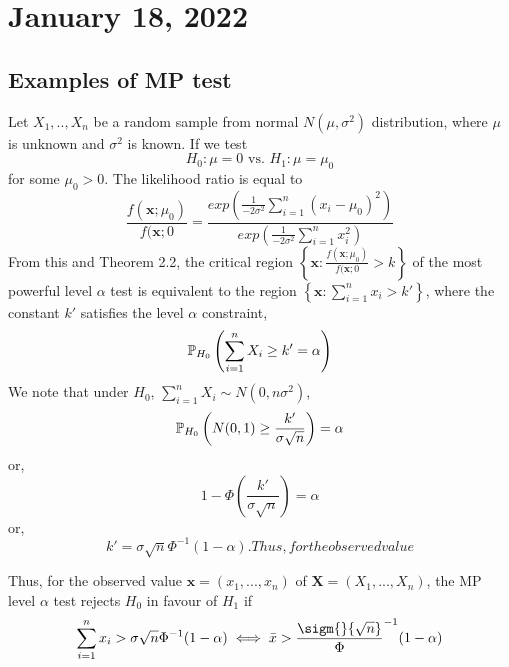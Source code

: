 \section{January 18, 2022}
\subsection{Examples of MP test}
\begin{example}
Let $X_1,..,X_n$ be a random sample from normal $N(\mu, \sigma^2)$ distribution, where $\mu$ is unknown and $\sigma^2$ is known. If we test
$$
H_0: \mu = 0  \text{ vs. } H_1:\mu = \mu_0
$$ for some $\mu_0>0$. The likelihood ratio is equal to 
$$
\frac{f(\boldsymbol{x};\mu_0)}{f(\boldsymbol{x};0} = \frac{exp(\frac{1}{-2 \sigma^2}\sum_{i=1}^{n}(x_i - \mu_0)^2)}{exp(\frac{1}{-2\sigma^2}\sum_{i=1}^{n}x_i^{2})}
$$
From this and Theorem 2.2, the critical region 
$ \left\{ 
\boldsymbol{x}: \frac{f(\boldsymbol{x};\mu_0)}{f(\boldsymbol{x};0} > k
\right \}$ of the most powerful level $\alpha$ test is equivalent to the region 
$ \left\{ 
\boldsymbol{x}: \sum_{i=1}^{n}x_i > k'
\right \}$,
where the constant $k'$ satisfies the level $\alpha$ constraint,
$$
\mathbb P_{H_0} \left( 
\sum_{i=1}^{n}X_i \geq k' = \alpha
\right)
$$
We note that under $H_0$, $\sum_{i=1}^{n}X_i \sim N(0,n\sigma^2)$,
$$
\mathbb P_{H_0} \left(
N(0,1) \geq \frac{k'}{\sigma \sqrt{n}}
\right) = \alpha
$$
or,
$$
1 - \Phi \left( \frac{k'}{\sigma \sqrt{n}} \right ) = \alpha
$$
or,
$$
k' = \sigma \sqrt{n}\Phi^{-1}(1-\alpha). 
Thus, for the observed value
$$

Thus, for the observed value
$\boldsymbol{x} = (x_1,...,x_n)$ of $\boldsymbol{X} = (X_1,...,X_n)$, the MP level $\alpha$ test rejects $H_0$ in favour of $H_1$ if 
$$
\sum_{i=1}^{n}x_i > \sigma \sqrt{n}\Phi^{-1}(1-\alpha) \iff  \bar{x} > \frac\sigm{}{\sqrt{n}}\Phi^{-1}(1-\alpha)
$$

\end{example}